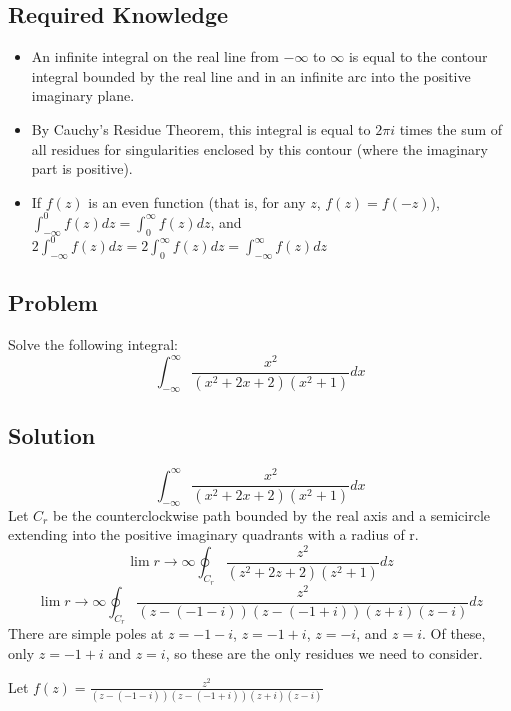 \documentclass[12pt]{article}
\begin{document}
\subsection{Required Knowledge}
\begin{itemize}
    \item An infinite integral on the real line from $-\infty$ to $\infty$ is equal to the contour integral bounded by the real line and in an infinite arc into the positive imaginary plane.
    \item By Cauchy's Residue Theorem, this integral is equal to $2\pi i$ times the sum of all residues for singularities enclosed by this contour (where the imaginary part is positive).
    \item If $f(z)$ is an even function (that is, for any $z$, $f(z)=f(-z)$), $\int_{-\infty}^{0}f(z)dz=\int_{0}^{\infty}f(z)dz$, and $2\int_{-\infty}^{0}f(z)dz=2\int_{0}^{\infty}f(z)dz=\int_{-\infty}^{\infty}f(z)dz$
\end{itemize}
\subsection{Problem}
Solve the following integral:
\begin{equation}
	\int_{-\infty}^{\infty}\frac{x^2}{(x^2+2x+2)(x^2+1)}dx
\end{equation}
\subsection{Solution}
\begin{equation}
	\int_{-\infty}^{\infty}\frac{x^2}{(x^2+2x+2)(x^2+1)}dx
\end{equation}
Let $C_r$ be the counterclockwise path bounded by the real axis and a semicircle extending into the positive imaginary quadrants with a radius of r.
\begin{equation}
	\lim{r\to\infty}\oint_{C_r}\frac{z^2}{(z^2+2z+2)(z^2+1)}dz
\end{equation}
\begin{equation}
	\lim{r\to\infty}\oint_{C_r}\frac{z^2}{(z-(-1-i))(z-(-1+i))(z+i)(z-i)}dz
\end{equation}
There are simple poles at $z=-1-i$, $z=-1+i$, $z=-i$, and $z=i$.  Of these, only $z=-1+i$ and $z=i$, so these are the only residues we need to consider.

Let $f(z)=\frac{z^2}{(z-(-1-i))(z-(-1+i))(z+i)(z-i)}$
\end{document}
